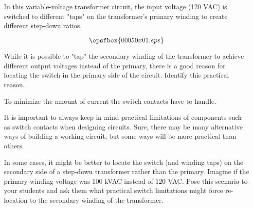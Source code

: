 

In this variable-voltage transformer circuit, the input voltage (120 VAC) is switched to different "taps" on the transformer's primary winding to create different step-down ratios.

$$\epsfbox{00050x01.eps}$$

While it is possible to "tap" the secondary winding of the transformer to achieve different output voltages instead of the primary, there is a good reason for locating the switch in the primary side of the circuit.  Identify this practical reason.
 






To minimize the amount of current the switch contacts have to handle.







It is important to always keep in mind practical limitations of components such as switch contacts when designing circuits.  Sure, there may be many alternative ways of building a working circuit, but some ways will be more practical than others.

In some cases, it might be better to locate the switch (and winding taps) on the secondary side of a step-down transformer rather than the primary.  Imagine if the primary winding voltage was 100 kVAC instead of 120 VAC.  Pose this scenario to your students and ask them what practical switch limitations might force re-location to the secondary winding of the transformer.




